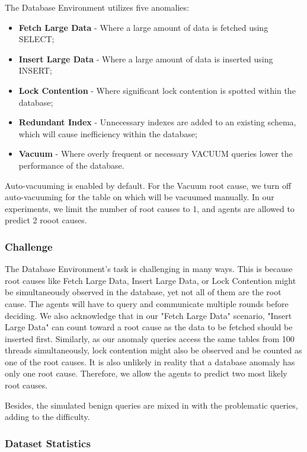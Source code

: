 The Database Environment utilizes five anomalies:
\begin{itemize}
    \item \textbf{Fetch Large Data} - Where a large amount of data is fetched using SELECT;
    \item \textbf{Insert Large Data} - Where a large amount of data is inserted using INSERT;
    \item \textbf{Lock Contention} - Where significant lock contention is spotted within the database;
    \item \textbf{Redundant Index} - Unnecessary indexes are added to an existing schema, which will cause inefficiency within the database;
    \item \textbf{Vacuum} - Where overly frequent or necessary VACUUM queries lower the performance of the database.
\end{itemize}

Auto-vacuuming is enabled by default. For the Vacuum root cause, we turn off auto-vacuuming for the table on which will be vacuumed manually. In our experiments, we limit the number of root causes to 1, and agents are allowed to predict 2 rooot causes.

\subsubsection{Challenge}

The Database Environment's task is challenging in many ways. This is because root causes like Fetch Large Data, Insert Large Data, or Lock Contention might be simultaneously observed in the database, yet not all of them are the root cause. The agents will have to query and communicate multiple rounds before deciding. We also acknowledge that in our "Fetch Large Data" scenario, "Insert Large Data" can count toward a root cause as the data to be fetched should be inserted first. Similarly, as our anomaly queries access the same tables from 100 threads simultaneously, lock contention might also be observed and be counted as one of the root causes. It is also unlikely in reality that a database anomaly has only one root cause. Therefore, we allow the agents to predict two most likely root causes.

Besides, the simulated benign queries are mixed in with the problematic queries, adding to the difficulty.


\subsubsection{Dataset Statistics}

